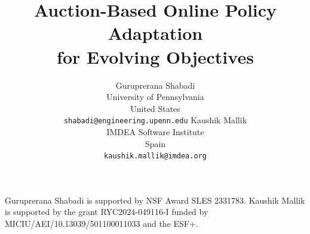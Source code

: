 \documentclass{article}
\title{Auction-Based Online Policy Adaptation\\for Evolving Objectives}
\author{%
  Guruprerana Shabadi \\
  University of Pennsylvania \\
  United States \\
  \texttt{shabadi@engineering.upenn.edu}
  \And
  Kaushik Mallik \\
  IMDEA Software Institute \\
  Spain \\
  \texttt{kaushik.mallik@imdea.org}
}
\begin{document}
\maketitle






%


%
%



\FloatBarrier
\begin{ack}
Guruprerana Shabadi is supported by NSF Award SLES 2331783.
Kaushik Mallik is supported by the grant RYC2024-049116-I funded by MICIU/AEI/10.13039/501100011033 and the ESF+.
\end{ack}






\clearpage
\appendix




%
%





\clearpage

\end{document}

